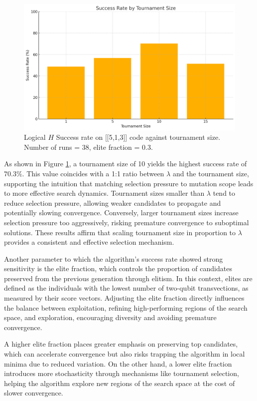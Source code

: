 \begin{figure}[h]
    \centering
    \includegraphics[width=1\linewidth]{Logos/output-2.png}
    \caption{Logical \(H\) Success rate on [[5,1,3]] code against tournament size. Number of runs = 38, elite fraction = 0.3.}
    \label{fig: tournament size chart}
\end{figure}

As shown in Figure \ref{fig: tournament size chart}, a tournament size of 10 yields the highest success rate of \(70.3\%\). This value coincides with a 1:1 ratio between \(\lambda\) and the tournament size, supporting the intuition that matching selection pressure to mutation scope leads to more effective search dynamics. Tournament sizes smaller than \(\lambda\) tend to reduce selection pressure, allowing weaker candidates to propagate and potentially slowing convergence. Conversely, larger tournament sizes increase selection pressure too aggressively, risking premature convergence to suboptimal solutions. These results affirm that scaling tournament size in proportion to \(\lambda\) provides a consistent and effective selection mechanism.

Another parameter to which the algorithm's success rate showed strong sensitivity is the elite fraction, which controls the proportion of candidates preserved from the previous generation through elitism. In this context, elites are defined as the individuals with the lowest number of two-qubit transvections, as measured by their score vectors. Adjusting the elite fraction directly influences the balance between exploitation, refining high-performing regions of the search space, and exploration, encouraging diversity and avoiding premature convergence.

A higher elite fraction places greater emphasis on preserving top candidates, which can accelerate convergence but also risks trapping the algorithm in local minima due to reduced variation. On the other hand, a lower elite fraction introduces more stochasticity through mechanisms like tournament selection, helping the algorithm explore new regions of the search space at the cost of slower convergence. 

